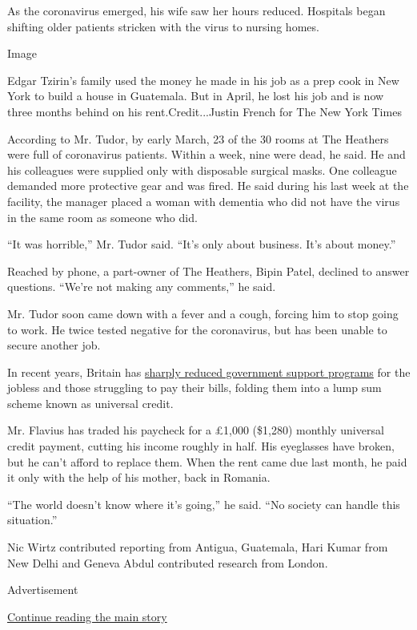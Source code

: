 As the coronavirus emerged, his wife saw her hours reduced. Hospitals
began shifting older patients stricken with the virus to nursing homes.

Image

Edgar Tzirin's family used the money he made in his job as a prep cook
in New York to build a house in Guatemala. But in April, he lost his job
and is now three months behind on his rent.Credit...Justin French for
The New York Times

According to Mr. Tudor, by early March, 23 of the 30 rooms at The
Heathers were full of coronavirus patients. Within a week, nine were
dead, he said. He and his colleagues were supplied only with disposable
surgical masks. One colleague demanded more protective gear and was
fired. He said during his last week at the facility, the manager placed
a woman with dementia who did not have the virus in the same room as
someone who did.

``It was horrible,'' Mr. Tudor said. ``It's only about business. It's
about money.''

Reached by phone, a part-owner of The Heathers, Bipin Patel, declined to
answer questions. ``We're not making any comments,'' he said.

Mr. Tudor soon came down with a fever and a cough, forcing him to stop
going to work. He twice tested negative for the coronavirus, but has
been unable to secure another job.

In recent years, Britain has
\href{https://www.nytimes3xbfgragh.onion/2018/05/28/world/europe/uk-austerity-poverty.html}{sharply
reduced government support programs} for the jobless and those
struggling to pay their bills, folding them into a lump sum scheme known
as universal credit.

Mr. Flavius has traded his paycheck for a £1,000 (\$1,280) monthly
universal credit payment, cutting his income roughly in half. His
eyeglasses have broken, but he can't afford to replace them. When the
rent came due last month, he paid it only with the help of his mother,
back in Romania.

``The world doesn't know where it's going,'' he said. ``No society can
handle this situation.''

Nic Wirtz contributed reporting from Antigua, Guatemala, Hari Kumar from
New Delhi and Geneva Abdul contributed research from London.

Advertisement

\protect\hyperlink{after-bottom}{Continue reading the main story}

